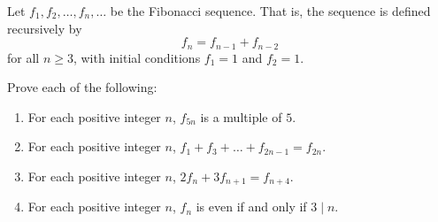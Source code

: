 \begin{problem}
    Let $f_1, f_2, \dots, f_n, \dots$ be the Fibonacci sequence. That is, the sequence is defined recursively by \[f_n = f_{n-1} + f_{n-2}\] for all $n \geq 3$, with initial conditions $f_1 = 1$ and $f_2 = 1$.

    Prove each of the following:

    \begin{enumerate}
        \item For each positive integer $n$, $f_{5n}$ is a multiple of $5$.
        \item For each positive integer $n$, $f_1 + f_3 + \dots + f_{2n-1} = f_{2n}$.
        \item For each positive integer $n$, $2f_n + 3f_{n+1} = f_{n+4}$.
        \item For each positive integer $n$, $f_{n}$ is even if and only if $3 \mid n$.
    \end{enumerate}
\end{problem}

